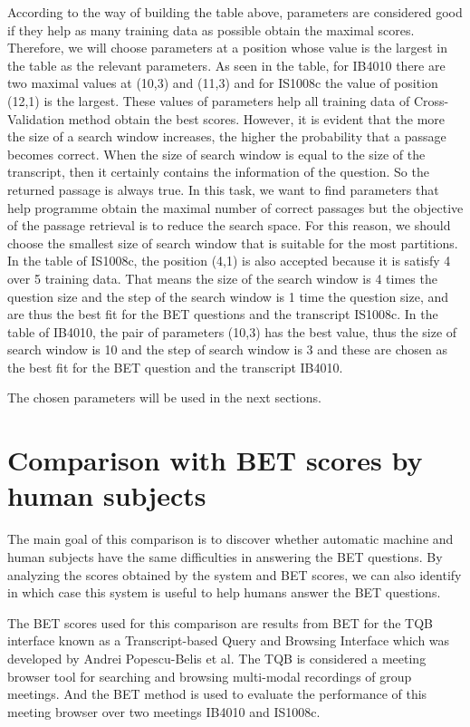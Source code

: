 According to the way of building the table above, parameters are considered good if they help as many training data as possible obtain the maximal scores. Therefore, we will choose parameters at a position whose value is the largest in the table as the relevant parameters. As seen in the table, for IB4010 there are two maximal values at (10,3) and (11,3) and for IS1008c the value of position (12,1) is the largest. These values of parameters help all training data of Cross-Validation method obtain the best scores. However, it is evident that the more the size of a search window increases, the higher the probability that a passage becomes correct. When the size of search window is equal to the size of the transcript, then it certainly contains the information of the question. So the returned passage is always true. In this task, we want to find parameters that help programme obtain the maximal number of correct passages but the objective of the passage retrieval is to reduce the search space. For this reason, we should choose the smallest size of search window that is suitable for the most partitions. In the table of IS1008c, the position (4,1) is also accepted because it is satisfy 4 over 5 training data. That means the size of the search window is 4 times the question size and the step of the search window is 1 time the question size, and are thus the best fit for the BET questions and the transcript IS1008c. 
In the table of IB4010, the pair of parameters (10,3) has the best value, thus the size of search window is 10 and the step of search window is 3 and these are chosen as the best fit for the BET question and the transcript IB4010.

The chosen parameters will be used in the next sections.




\section{Comparison with BET scores by human subjects}

 The main goal of this comparison is to discover whether automatic machine and human subjects have the same difficulties in answering the BET questions. By analyzing the scores obtained by the system and BET scores, we can also identify in which case this system is useful to help humans answer the BET questions. 

The BET scores used for this comparison are results from BET for the TQB interface \cite{popescubelis2007otm} known as a Transcript-based Query and Browsing Interface which was developed by Andrei Popescu-Belis et al. The TQB is considered a meeting browser tool for searching and browsing multi-modal recordings of group meetings. And the BET method is used to evaluate the performance of this meeting browser over two meetings IB4010 and IS1008c.

